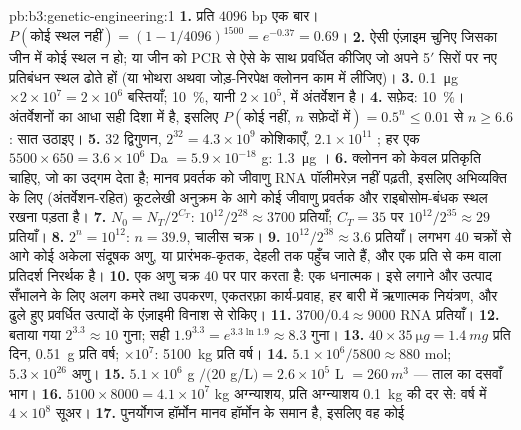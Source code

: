 \begin{solution}{pb:b3:genetic-engineering:1}
\textbf{1.} प्रति $4096$ bp एक बार। $P(\text{कोई स्थल नहीं}) = (1 - 1/4096)^{1500}
= e^{-0.37} = 0.69$।
\textbf{2.} ऐसी एंज़ाइम चुनिए जिसका जीन में कोई स्थल न हो; या जीन को
PCR से ऐसे  के साथ प्रवर्धित कीजिए जो अपने 5$'$
सिरों पर नए प्रतिबंधन स्थल ढोते हों (या भोथरा अथवा जोड़-निरपेक्ष
क्लोनन काम में लीजिए)।
\textbf{3.} \qty{0.1}{\micro g}\,$\times 2\times 10^{7} = 2\times
10^{6}$ बस्तियाँ; \qty{10}{\%}, यानी $2\times 10^{5}$, में अंतर्वेशन है।
\textbf{4.} सफ़ेद: \qty{10}{\%}। अंतर्वेशनों का आधा सही दिशा में है,
इसलिए $P(\text{कोई नहीं, } n \text{ सफ़ेदों में}) = 0.5^{n} \le 0.01$
से $n \ge 6.6$: सात उठाइए।
\textbf{5.} $32$ द्विगुणन, $2^{32} = 4.3\times 10^{9}$ कोशिकाएँ, $2.1\times
10^{11}$ ; हर एक $5500\times 650 = 3.6\times 10^{6}$ Da $=
5.9\times 10^{-18}$ g: \qty{1.3}{\micro g} ।
\textbf{6.} क्लोनन को केवल प्रतिकृति चाहिए, जो  का उद्गम देता
है; मानव प्रवर्तक को जीवाणु RNA पॉलीमरेज़ नहीं पढ़ती, इसलिए अभिव्यक्ति
के लिए (अंतर्वेशन-रहित) कूटलेखी अनुक्रम के आगे कोई जीवाणु प्रवर्तक और
राइबोसोम-बंधक स्थल रखना पड़ता है।
\textbf{7.} $N_{0} = N_{T}/2^{C_{T}}$: $10^{12}/2^{28} \approx 3700$
प्रतियाँ; $C_{T} = 35$ पर $10^{12}/2^{35} \approx 29$ प्रतियाँ।
\textbf{8.} $2^{n} = 10^{12}$: $n = 39.9$, चालीस चक्र।
\textbf{9.} $10^{12}/2^{38} \approx 3.6$ प्रतियाँ। लगभग $40$ चक्रों से
आगे कोई अकेला संदूषक अणु, या प्रारंभक-कृतक, देहली तक पहुँच जाते हैं, और
एक प्रति से कम वाला प्रतिदर्श निरर्थक है।
\textbf{10.} एक अणु चक्र $40$ पर पार करता है: एक धनात्मक। इसे लगाने और
उत्पाद सँभालने के लिए अलग कमरे तथा उपकरण, एकतरफ़ा कार्य-प्रवाह, हर बारी
में ऋणात्मक नियंत्रण, और ढुले हुए प्रवर्धित उत्पादों के एंज़ाइमी विनाश
से रोकिए।
\textbf{11.} $3700/0.4 \approx 9000$ RNA प्रतियाँ।
\textbf{12.} बताया गया $2^{3.3} \approx 10$ गुना; सही $1.9^{3.3} =
e^{3.3\ln 1.9} \approx 8.3$ गुना।
\textbf{13.} $40\times \qty{35}{\micro g} = \qty{1.4}{mg}$ प्रति दिन,
\qty{0.51}{g} प्रति वर्ष; $\times 10^{7}$: \qty{5100}{kg} प्रति वर्ष।
\textbf{14.} $5.1\times 10^{6}/5800 \approx 880$ mol; $5.3\times 10^{26}$
अणु।
\textbf{15.} $5.1\times 10^{6}$ g $/ (20$ g/L$) = 2.6\times 10^{5}$ L
$= \qty{260}{m^3}$ --- ताल का दसवाँ भाग।
\textbf{16.} $5100\times 8000 = 4.1\times 10^{7}$ kg अग्न्याशय, प्रति
अग्न्याशय \qty{0.1}{kg} की दर से: वर्ष में $4\times 10^{8}$ सूअर।
\textbf{17.} पुनर्योगज हॉर्मोन मानव हॉर्मोन के समान है, इसलिए वह कोई

\end{solution}
